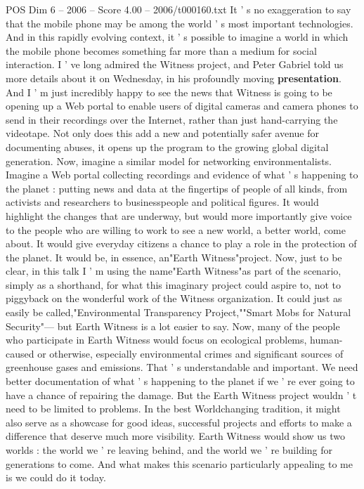\begin{textsample}{POS Dim 6 – 2006 – Score 4.00 – 2006/t000160.txt}
It ' s no exaggeration to say that the mobile phone may be among the world ' s most important technologies.
And in this rapidly evolving context, it ' s possible to imagine a world in which the mobile phone becomes something far more than a medium for social interaction.
I ' ve long admired the Witness project, and Peter Gabriel told us more details about it on Wednesday, in his profoundly moving \textbf{presentation}.
And I ' m just incredibly happy to see the news that Witness is going to be opening up a Web portal to enable users of digital cameras and camera phones to send in their recordings over the Internet, rather than just hand-carrying the videotape.
Not only does this add a new and potentially safer avenue for documenting abuses, it opens up the program to the growing global digital generation.
Now, imagine a similar model for networking environmentalists.
Imagine a Web portal collecting recordings and evidence of what ' s happening to the planet : putting news and data at the fingertips of people of all kinds, from activists and researchers to businesspeople and political figures.
It would highlight the changes that are underway, but would more importantly give voice to the people who are willing to work to see a new world, a better world, come about.
It would give everyday citizens a chance to play a role in the protection of the planet.
It would be, in essence, an"Earth Witness"project.
Now, just to be clear, in this talk I ' m using the name"Earth Witness"as part of the scenario, simply as a shorthand, for what this imaginary project could aspire to, not to piggyback on the wonderful work of the Witness organization.
It could just as easily be called,"Environmental Transparency Project,""Smart Mobs for Natural Security"— but Earth Witness is a lot easier to say.
Now, many of the people who participate in Earth Witness would focus on ecological problems, human-caused or otherwise, especially environmental crimes and significant sources of greenhouse gases and emissions.
That ' s understandable and important.
We need better documentation of what ' s happening to the planet if we ' re ever going to have a chance of repairing the damage.
But the Earth Witness project wouldn ' t need to be limited to problems.
In the best Worldchanging tradition, it might also serve as a showcase for good ideas, successful projects and efforts to make a difference that deserve much more visibility.
Earth Witness would show us two worlds : the world we ' re leaving behind, and the world we ' re building for generations to come.
And what makes this scenario particularly appealing to me is we could do it today.

\end{textsample}
